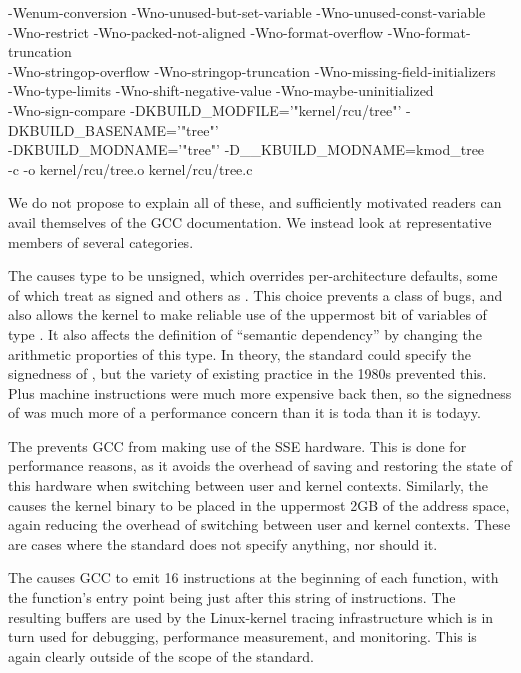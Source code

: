 \documentclass[10]{article}
\begin{document}
{{	-Wenum-conversion
	-Wno-unused-but-set-variable -Wno-unused-const-variable \\
	-Wno-restrict -Wno-packed-not-aligned -Wno-format-overflow
	-Wno-format-truncation \\
	-Wno-stringop-overflow
	-Wno-stringop-truncation -Wno-missing-field-initializers \\
	-Wno-type-limits -Wno-shift-negative-value
	-Wno-maybe-uninitialized \\
	-Wno-sign-compare
	-DKBUILD\_MODFILE='"kernel/rcu/tree"'
	-DKBUILD\_BASENAME='"tree"' \\
	-DKBUILD\_MODNAME='"tree"' -D\_\_KBUILD\_MODNAME=kmod\_tree \\
	-c -o kernel/rcu/tree.o kernel/rcu/tree.c
	}
}

We do not propose to explain all of these, and sufficiently motivated
readers can avail themselves of the GCC documentation.
We instead look at representative members of several categories.

The  causes type  to be unsigned, which
overrides per-architecture defaults, some of which treat 
as signed and others as .
This choice prevents a class of bugs, and also allows the kernel to make
reliable use of the uppermost bit of variables of type .
It also affects the definition of ``semantic dependency'' by changing
the arithmetic proporties of this type.
In theory, the standard could specify the signedness of , but the
variety of existing practice in the 1980s prevented this.
Plus machine instructions were much more expensive back then, so the
signedness of  was much more of a performance concern than
it is toda than
it is todayy.

The  prevents GCC from making use of the SSE hardware.
This is done for performance reasons, as it avoids the overhead of
saving and restoring the state of this hardware when switching between
user and kernel contexts.
Similarly, the  causes the kernel binary to be
placed in the uppermost 2GB of the address space, again reducing
the overhead of switching between user and kernel contexts.
These are cases where the standard does not specify anything, nor
should it.

The  causes GCC to emit 16
 instructions at the beginning of each function, with
the function's entry point being just after this string of 
instructions.
The resulting buffers are used by the Linux-kernel tracing infrastructure
which is in turn used for debugging, performance measurement, and
monitoring.
This is again clearly outside of the scope of the standard.
\end{document}
